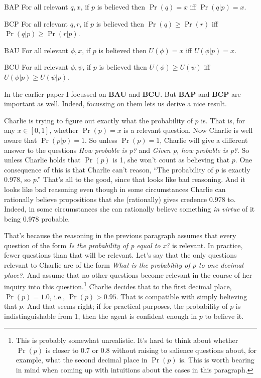 \documentclass[11pt,oneside]{book}
\begin{document}
\begin{description*}
\item[BAP] For all relevant $q, x$, if $p$ is believed then $\Pr(q) = x$ iff $\Pr(q | p) = x$.
\item[BCP] For all relevant $q, r$, if $p$ is believed then $\Pr(q) \geq \Pr(r)$ iff $\Pr(q | p) \geq \Pr(r | p)$.
\item[BAU] For all relevant $\phi, x$, if $p$ is believed then $U(\phi) = x$ iff $U(\phi | p) = x$.
\item[BCU] For all relevant $\phi, \psi$, if $p$ is believed then $U(\phi) \geq U(\psi)$ iff $U(\phi | p) \geq U(\psi | p)$.
\end{description*}

\noindent In the earlier paper I focussed on \textbf{BAU} and \textbf{BCU}. But \textbf{BAP} and \textbf{BCP} are important as well. Indeed, focussing on them lets us derive a nice result. 

Charlie is trying to figure out exactly what the probability of $p$ is. That is, for any $x \in [0, 1]$, whether $\Pr(p) = x$ is a relevant question. Now Charlie is well aware that $\Pr(p | p) = 1$. So unless $\Pr(p) = 1$, Charlie will give a different answer to the questions \textit{How probable is p?} and \textit{Given p, how probable is p?}. So unless Charlie holds that $\Pr(p)$ is 1, she won't count as believing that $p$. One consequence of this is that Charlie can't reason, ``The probability of $p$ is exactly 0.978, so $p$.'' That's all to the good, since that looks like bad reasoning. And it looks like bad reasoning even though in some circumstances Charlie can rationally believe propositions that she (rationally) gives credence 0.978 to. Indeed, in some circumstances she can rationally believe something \textit{in virtue} of it being 0.978 probable.

That's because the reasoning in the previous paragraph assumes that every question of the form \textit{Is the probability of p equal to x?} is relevant. In practice, fewer questions than that will be relevant. Let's say that the only questions relevant to Charlie are of the form \textit{What is the probability of $p$ to one decimal place?}. And assume that no other questions become relevant in the course of her inquiry into this question.\footnote{This is probably somewhat unrealistic. It's hard to think about whether $\Pr(p)$ is closer to 0.7 or 0.8 without raising to salience questions about, for example, what the second decimal place in $\Pr(p)$ is. This is worth bearing in mind when coming up with intuitions about the cases in this paragraph.} Charlie decides that to the first decimal place, $\Pr(p) = 1.0$, i.e., $\Pr(p) > 0.95$. That is compatible with simply believing that $p$. And that seems right; if for practical purposes, the probability of $p$ is indistinguishable from 1, then the agent is confident enough in $p$ to believe it.
\end{document}
